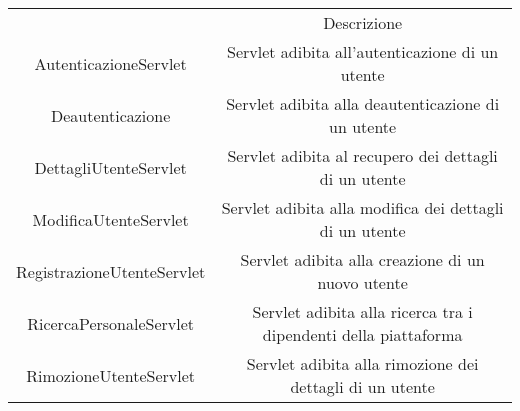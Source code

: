 \documentclass[12pt,a4paper]{article}
\begin{document}
\begin{center}
\begin{tabular}{|c|c|}
\hline
\rowcolor[HTML]{C0C0C0} 
\multicolumn{2}{|c|}{\cellcolor[HTML]{C0C0C0}Utente} \\ \hline
\rowcolor[HTML]{C0C0C0}  \multicolumn{1}{|c|}{\cellcolor[HTML]{C0C0C0}Classe}  &  Descrizione \\ \hline

AutenticazioneServlet & \begin{minipage}{10cm} \vspace{5pt}
Servlet adibita all'autenticazione di un utente \vspace{5pt}
\end{minipage} \\ \hline

Deautenticazione & \begin{minipage}{10cm} \vspace{5pt}
Servlet adibita alla deautenticazione di un utente \vspace{5pt}
\end{minipage} \\ \hline

DettagliUtenteServlet & \begin{minipage}{10cm} \vspace{5pt}
Servlet adibita al recupero dei dettagli di un utente \vspace{5pt}
\end{minipage} \\ \hline

ModificaUtenteServlet & \begin{minipage}{10cm} \vspace{5pt}
Servlet adibita alla modifica dei dettagli di un utente \vspace{5pt}
\end{minipage} \\ \hline

RegistrazioneUtenteServlet & \begin{minipage}{10cm} \vspace{5pt}
Servlet adibita alla creazione di un nuovo utente \vspace{5pt}
\end{minipage} \\ \hline

RicercaPersonaleServlet & \begin{minipage}{10cm} \vspace{5pt}
Servlet adibita alla ricerca tra i dipendenti della piattaforma \vspace{5pt}
\end{minipage} \\ \hline

RimozioneUtenteServlet & \begin{minipage}{10cm} \vspace{5pt}
Servlet adibita alla rimozione dei dettagli di un utente \vspace{5pt}
\end{minipage} \\ \hline

\end{tabular}
\end{center}
\end{document}
